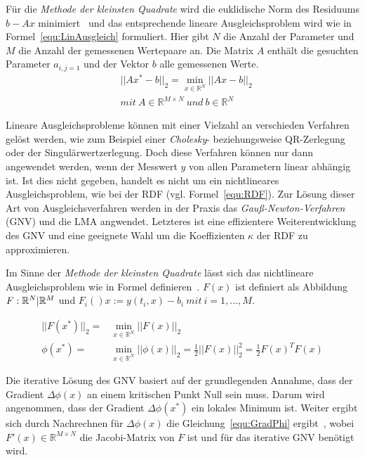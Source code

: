 Für die \textit{Methode der kleinsten Quadrate} wird die euklidische Norm des Residuums $b-Ax$ minimiert~\cite{dahmen2008numerik} und das entsprechende lineare Ausgleichsproblem wird wie in Formel~\ref{equ:LinAusgleich} formuliert. Hier gibt $N$ die Anzahl der Parameter und $M$ die Anzahl der gemessenen Wertepaare an. Die Matrix $A$ enthält die gesuchten Parameter $a_{i,j=1}$ und der Vektor $b$ alle gemessenen Werte.
\begin{equation}
\label{equ:LinAusgleich}
\begin{aligned}
& ||Ax^*-b||_2 = \min_{x\in \mathbb{R}^N} ||Ax-b||_2\\
& mit\ A\in \mathbb{R}^{M\times N}\ und\ b\in \mathbb{R}^{N}
\end{aligned}
\end{equation}

Lineare Ausgleichsprobleme können mit einer Vielzahl an verschieden Verfahren gelöst werden, wie zum Beispiel einer \textit{Cholesky}- beziehungsweise QR-Zerlegung oder der Singulärwertzerlegung.
Doch diese Verfahren können nur dann angewendet werden, wenn der Messwert $y$ von allen Parametern linear abhängig ist. Ist dies nicht gegeben, handelt es nicht um ein nichtlineares Ausgleichsproblem, wie bei der RDF (vgl. Formel~\ref{equ:RDF}). Zur Lösung dieser Art von Ausgleichsverfahren werden in der Praxis das \textit{Gauß-Newton-Verfahren} (GNV) und die LMA angwendet. Letzteres ist eine effizientere Weiterentwicklung des GNV und eine geeignete Wahl um die Koeffizienten $\kappa$ der RDF zu approximieren.

Im Sinne der \textit{Methode der kleinsten Quadrate} lässt sich das nichtlineare Ausgleichsproblem wie in Formel definieren~\cite{schwarz2011numerische}. $F(x)$ ist definiert als Abbildung $F: \mathbb{R}^N \arrowvert \mathbb{R}^M$ und $F_i()x:= y(t_i,x)-b_i\ mit\ i= 1,\dots,M$. 

\begin{equation}
\label{equ:LinAusgleich}
\begin{aligned}
||F(x^*)||_2 =& \min_{x\in \mathbb{R}^N} ||F(x)||_2\\
\phi(x^*)=& \min_{x\in \mathbb{R}^N} ||\phi(x)||_2 = \frac{1}{2}||F(x)||_2^2 = \frac{1}{2}F(x)^TF(x)
\end{aligned}
\end{equation}

Die iterative Lösung des GNV basiert auf der grundlegenden Annahme, dass der Gradient $\Delta\phi(x)$ an einem kritischen Punkt Null sein muss. Darum wird angenommen, dass der Gradient $\Delta\phi(x^*)$ ein lokales Minimum ist. Weiter ergibt sich durch Nachrechnen für $\Delta\phi(x)$ die Gleichung~\ref{equ:GradPhi} ergibt~\cite{dahmen2008numerik}, wobei $F'(x) \in \mathbb{R}^{M \times N}$ die Jacobi-Matrix von $F$ ist und für das iterative GNV benötigt wird.


